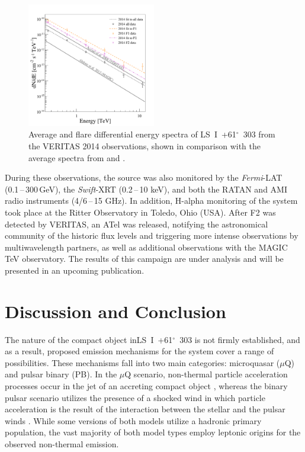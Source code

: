\documentclass[preprint2]{aastex}
\newcommand{\lsi}{LS~I~+61$^{\circ}$~303}
\newcommand{\gev}{\,GeV}
\begin{document}
\begin{figure}[ht]
\centering
\includegraphics[width=0.5\textwidth]{figs/all_spectra_coloured.pdf}
\caption{Average and flare differential energy spectra of \lsi{} from the VERITAS 2014 observations, shown in comparison with the average spectra from \citet{VERITASLSIDetection} and \citet{Aleksic}.}
\label{spec}
\end{figure}

During these observations, the source was also monitored by the \emph{Fermi}-LAT (0.1\,--\,300\gev{}), the \emph{Swift}-XRT (0.2\,--\,10 keV), and both the RATAN and AMI radio instruments (4/6\,--\,15 GHz). In addition, H-alpha monitoring of the system took place at the Ritter Observatory in Toledo, Ohio (USA). After F2 was detected by VERITAS, an ATel \citep{2015VTSATEL} was released, notifying the astronomical community of the historic flux levels and triggering more intense observations by multiwavelength partners, as well as additional observations with the MAGIC TeV observatory. The results of this campaign are under analysis and will be presented in an upcoming publication. 

\section{Discussion and Conclusion}
The nature of the compact object in\linebreak \lsi{} is not firmly established, and as a result, proposed emission mechanisms for the system cover a range of possibilities. These mechanisms fall into two main categories: microquasar ($\mu$Q) and pulsar binary (PB). In the $\mu$Q scenario, non-thermal particle acceleration processes occur in the jet of an accreting compact object \citep{Massi2001,Massi2013,2015A&A...575L...9M}, whereas the binary pulsar scenario utilizes the presence of a shocked wind in which particle acceleration is the result of the interaction between the stellar and the pulsar winds \citep{Dhawan2006}. While some versions of both models utilize a hadronic primary population, the vast majority of both model types employ leptonic origins for the observed non-thermal emission.
\end{document}

